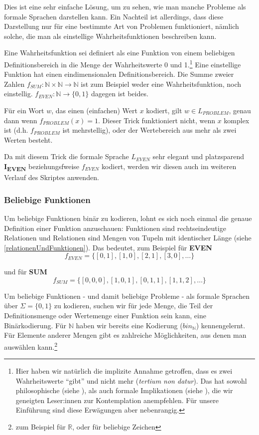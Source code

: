 Dies ist eine sehr einfache Lösung, um zu sehen,
wie man manche Probleme als formale Sprachen darstellen kann.
Ein Nachteil ist allerdings, dass diese Darstellung
nur für eine bestimmte Art von Problemen funktioniert,
nämlich solche, die man als einstellige Wahrheitsfunktionen beschreiben kann.


Eine Wahrheitsfunktion sei definiert als eine Funktion von einem beliebigen Definitionsbereich
in die Menge der Wahrheitswerte 0 und 1.\footnote{
    Hier haben wir natürlich die implizite Annahme getroffen,
    dass es zwei Wahrheitswerte ``gibt'' und nicht mehr (\emph{tertium non datur}).
    Das hat sowohl philosophische (siehe \cite{sep-logic-manyvalued}), als auch formale Implikationen (siehe \cite{gottwald}),
    die wir geneigten Leser:innen zur Kontemplation anempfehlen.
    Für unsere Einführung sind diese Erwägungen aber nebenrangig.
}
Eine einstellige Funktion hat einen eindimensionalen Definitionsbereich.
Die Summe zweier Zahlen $f_{SUM}: \mathbb{N} \times \mathbb{N} \rightarrow \mathbb{N}$
ist zum Beispiel weder eine Wahrheitsfunktion,
noch einstellig.
$f_{EVEN}: \mathbb{N} \rightarrow \{0,1\}$ dagegen ist beides.

Für ein Wort $w$, das einen (einfachen) Wert $x$ kodiert,
gilt $w \in L_{PROBLEM}$, genau dann wenn $f_{PROBLEM}(x) = 1$.
Dieser Trick funktioniert nicht,
wenn $x$ komplex ist (d.h. $f_{PROBLEM}$ ist mehrstellig),
oder der Wertebereich aus mehr als zwei Werten besteht.

Da mit diesem Trick die formale Sprache $L_{EVEN}$ sehr elegant und platzsparend
\textbf{I\textsubscript{EVEN}} beziehungsfweise $f_{EVEN}$ kodiert,
werden wir diesen auch im weiteren Verlauf des Skriptes anwenden.

\subsubsection{Beliebige Funktionen}
Um beliebige Funktionen binär zu kodieren,
lohnt es sich noch einmal die genaue Definition einer Funktion anzuschauen:
Funktionen sind rechtseindeutige Relationen und Relationen sind Mengen von Tupeln mit identischer Länge (siehe \autoref{relationenUndFunktionen}).
Das bedeutet, zum Beispiel für \textbf{EVEN}
\[
    f_{EVEN} = \{ [0,1], [1,0], [2,1], [3,0], \ldots \}
\]

und für \textbf{SUM}
\[
    f_{SUM} = \{ [0,0,0], [1,0,1], [0,1,1], [1,1,2], \ldots \}
\]

Um beliebige Funktionen - und damit beliebige Probleme -
als formale Sprachen über $\Sigma = \{0,1\}$ zu kodieren,
suchen wir für jede Menge,
die Teil der Definitionsmenge oder Wertemenge einer Funktion sein kann,
eine Binärkodierung.
Für $\mathbb{N}$
haben wir bereits eine Kodierung ($bin_{\mathbb{N}}$) kennengelernt.
Für Elemente anderer Mengen gibt es zahlreiche Möglichkeiten,
aus denen man auswählen kann.\footnote{
    zum Beispiel \cite{ieee754} für $\mathbb{R}$,
    oder \cite{RFC3629} für beliebige Zeichen
}\\


